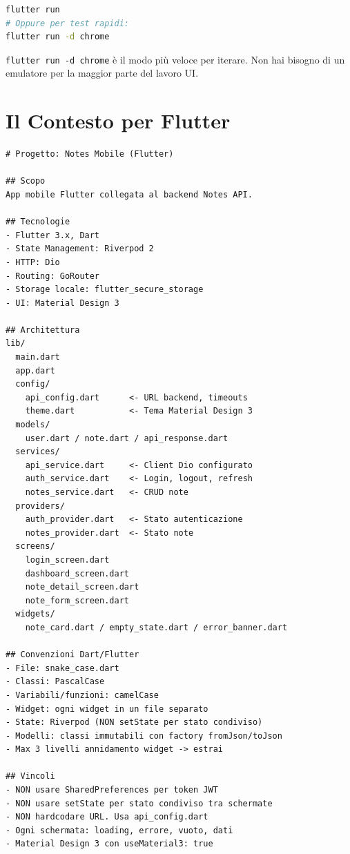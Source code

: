 \begin{praticabox}[title={Pratica --- Verifica che funzioni}]
\begin{lstlisting}[language=bash]
flutter run
# Oppure per test rapidi:
flutter run -d chrome
\end{lstlisting}
\end{praticabox}

\begin{tipbox}
\texttt{flutter run -d chrome} è il modo più veloce per iterare. Non hai bisogno di un emulatore per la maggior parte del lavoro UI.
\end{tipbox}

\section{Il Contesto per Flutter}

\begin{lstlisting}[language={},title={\texttt{\_CONTEXT.md} per Notes Mobile}]
# Progetto: Notes Mobile (Flutter)

## Scopo
App mobile Flutter collegata al backend Notes API.

## Tecnologie
- Flutter 3.x, Dart
- State Management: Riverpod 2
- HTTP: Dio
- Routing: GoRouter
- Storage locale: flutter_secure_storage
- UI: Material Design 3

## Architettura
lib/
  main.dart
  app.dart
  config/
    api_config.dart      <- URL backend, timeouts
    theme.dart           <- Tema Material Design 3
  models/
    user.dart / note.dart / api_response.dart
  services/
    api_service.dart     <- Client Dio configurato
    auth_service.dart    <- Login, logout, refresh
    notes_service.dart   <- CRUD note
  providers/
    auth_provider.dart   <- Stato autenticazione
    notes_provider.dart  <- Stato note
  screens/
    login_screen.dart
    dashboard_screen.dart
    note_detail_screen.dart
    note_form_screen.dart
  widgets/
    note_card.dart / empty_state.dart / error_banner.dart

## Convenzioni Dart/Flutter
- File: snake_case.dart
- Classi: PascalCase
- Variabili/funzioni: camelCase
- Widget: ogni widget in un file separato
- State: Riverpod (NON setState per stato condiviso)
- Modelli: classi immutabili con factory fromJson/toJson
- Max 3 livelli annidamento widget -> estrai

## Vincoli
- NON usare SharedPreferences per token JWT
- NON usare setState per stato condiviso tra schermate
- NON hardcodare URL. Usa api_config.dart
- Ogni schermata: loading, errore, vuoto, dati
- Material Design 3 con useMaterial3: true
\end{lstlisting}


